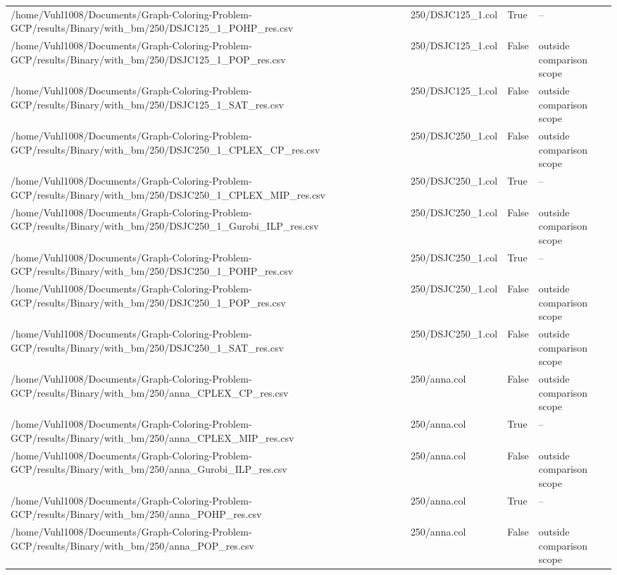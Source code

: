 \begin{table}[htbp]
\begin{tabular}{llll}
/home/Vuhl1008/Documents/Graph-Coloring-Problem-GCP/results/Binary/with\_bm/250/DSJC125\_1\_POHP\_res.csv & 250/DSJC125\_1.col & True & -- \\
/home/Vuhl1008/Documents/Graph-Coloring-Problem-GCP/results/Binary/with\_bm/250/DSJC125\_1\_POP\_res.csv & 250/DSJC125\_1.col & False & outside comparison scope \\
/home/Vuhl1008/Documents/Graph-Coloring-Problem-GCP/results/Binary/with\_bm/250/DSJC125\_1\_SAT\_res.csv & 250/DSJC125\_1.col & False & outside comparison scope \\
/home/Vuhl1008/Documents/Graph-Coloring-Problem-GCP/results/Binary/with\_bm/250/DSJC250\_1\_CPLEX\_CP\_res.csv & 250/DSJC250\_1.col & False & outside comparison scope \\
/home/Vuhl1008/Documents/Graph-Coloring-Problem-GCP/results/Binary/with\_bm/250/DSJC250\_1\_CPLEX\_MIP\_res.csv & 250/DSJC250\_1.col & True & -- \\
/home/Vuhl1008/Documents/Graph-Coloring-Problem-GCP/results/Binary/with\_bm/250/DSJC250\_1\_Gurobi\_ILP\_res.csv & 250/DSJC250\_1.col & False & outside comparison scope \\
/home/Vuhl1008/Documents/Graph-Coloring-Problem-GCP/results/Binary/with\_bm/250/DSJC250\_1\_POHP\_res.csv & 250/DSJC250\_1.col & True & -- \\
/home/Vuhl1008/Documents/Graph-Coloring-Problem-GCP/results/Binary/with\_bm/250/DSJC250\_1\_POP\_res.csv & 250/DSJC250\_1.col & False & outside comparison scope \\
/home/Vuhl1008/Documents/Graph-Coloring-Problem-GCP/results/Binary/with\_bm/250/DSJC250\_1\_SAT\_res.csv & 250/DSJC250\_1.col & False & outside comparison scope \\
/home/Vuhl1008/Documents/Graph-Coloring-Problem-GCP/results/Binary/with\_bm/250/anna\_CPLEX\_CP\_res.csv & 250/anna.col & False & outside comparison scope \\
/home/Vuhl1008/Documents/Graph-Coloring-Problem-GCP/results/Binary/with\_bm/250/anna\_CPLEX\_MIP\_res.csv & 250/anna.col & True & -- \\
/home/Vuhl1008/Documents/Graph-Coloring-Problem-GCP/results/Binary/with\_bm/250/anna\_Gurobi\_ILP\_res.csv & 250/anna.col & False & outside comparison scope \\
/home/Vuhl1008/Documents/Graph-Coloring-Problem-GCP/results/Binary/with\_bm/250/anna\_POHP\_res.csv & 250/anna.col & True & -- \\
/home/Vuhl1008/Documents/Graph-Coloring-Problem-GCP/results/Binary/with\_bm/250/anna\_POP\_res.csv & 250/anna.col & False & outside comparison scope \\

\end{tabular}
\end{table}
